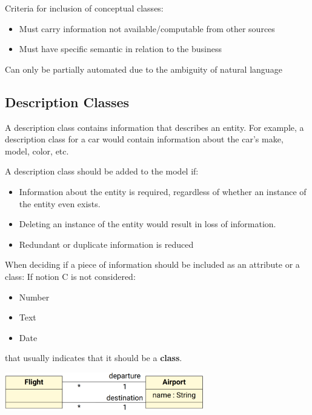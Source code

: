 \documentclass[
../../Software_Engineering_Summary.tex,
]
{subfiles}
\begin{document}
Criteria for inclusion of conceptual classes:
\begin{itemize}
    \item Must carry information not available/computable from other sources
    \item Must have specific semantic in relation to the business
\end{itemize}

Can only be partially automated due to the ambiguity of natural language

\subsection{Description Classes}
A description class contains information that describes an entity. For example, a description class for a car would contain information about the car's make, model, color, etc.

A description class should be added to the model if: 
\begin{itemize}
    \item Information about the entity is required, regardless of whether an instance of the entity even exists.
    \item Deleting an instance of the entity would result in loss of information.
    \item Redundant or duplicate information is reduced
\end{itemize}

\begin{defbox}
    When deciding if a piece of information should be included as an attribute or a class:
    If notion C is not considered:
    \begin{itemize}
        \item Number
        \item Text
        \item Date
    \end{itemize}
    that usually indicates that it should be a \textbf{class}.
    \begin{center}
        \includegraphics[width=0.65\textwidth]{Pics/04/ClassVsAttributeExample.png}
    \end{center}
\end{defbox}
\end{document}
